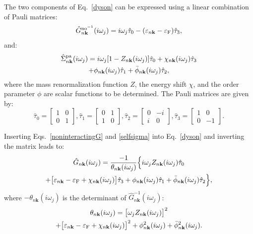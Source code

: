 \documentclass[final,3p,times,twocolumn]{elsarticle}
\begin{document}
The two components of Eq.~\eqref{dyson} can be expressed using a linear combination of Pauli matrices:
\begin{equation}\label{noninteractingG}
\hat{G}_{n\mathbf{k}}^{\text{no}^{-1}} (i\omega_j)  = i\omega_j \hat{\tau}_0 - (\varepsilon_{n\bf{k}}-\varepsilon_{\rm F})\hat{\tau}_3,
\end{equation}
and:
\begin{multline}\label{selfsigma}
\hat{\Sigma}_{n\mathbf{k}}^{\text{pa}} (i\omega_j) = i\omega_j [1-Z_{n\mathbf{k}}(i\omega_j)]\hat{\tau}_0 + \chi_{n\bf{k}}(i\omega_j)\hat{\tau}_3\\
+\phi_{n\bf{k}}(i\omega_j)\hat{\tau}_1  +\bar{\phi}_{n\bf{k}}(i\omega_j)\hat{\tau}_2,
\end{multline}
where the mass renormalization function $Z$, the energy shift $\chi$, and the order parameter $\phi$ are scalar functions to be determined. 
The Pauli matrices are given by:
\begin{equation}
\hat{\tau}_0 = \begin{bmatrix}1 & 0 \\
0 & 1 
\end{bmatrix},\hat{\tau}_1 = \begin{bmatrix}0 & 1 \\
1 & 0 
\end{bmatrix},\hat{\tau}_2 = \begin{bmatrix}0 & -i \\
i & 0 
\end{bmatrix},\hat{\tau}_3 = \begin{bmatrix}1 & 0 \\
0 & -1
\end{bmatrix}.
\end{equation}


Inserting Eqs.~\eqref{noninteractingG} and \eqref{selfsigma} into Eq.~\eqref{dyson} and inverting the matrix leads to: 
\begin{multline}\label{gnormaleq}
\hat{G}_{n\mathbf{k}}(i\omega_j)  =\frac{-1}{\theta_{n\mathbf{k}}(i\omega_j)}\Big\{ i\omega_j Z_{n\bf{k}}(i\omega_j)\hat{\tau}_0 \\
+\big[\varepsilon_{n\bf{k}}-\varepsilon_{\rm F} +\chi_{n\bf{k}}(i\omega_j)\big]\hat{\tau}_3  
+ \phi_{n\bf{k}}(i\omega_j)\hat{\tau}_1 + \bar{\phi}_{n\bf{k}}(i\omega_j)\hat{\tau}_2  \Big\},
\end{multline}
where $-\theta_{n\mathbf{k}}(i\omega_j)$ is the determinant of $\hat{G}_{n\mathbf{k}}^{-1} (i\omega_j)$:
\begin{multline}\label{defofdeno}
\theta_{n\mathbf{k}}(i\omega_j)  = \big[\omega_j Z_{n\bf{k}}(i\omega_j)\big]^2 \\
+ \big[ \varepsilon_{n\bf{k}}-\varepsilon_{\rm F} + \chi_{n\bf{k}}(i\omega_j)\big]^2 
+ \phi_{n\bf{k}}^2(i\omega_j) + \bar{\phi}_{n\bf{k}}^2(i\omega_j).
\end{multline}
\end{document}
